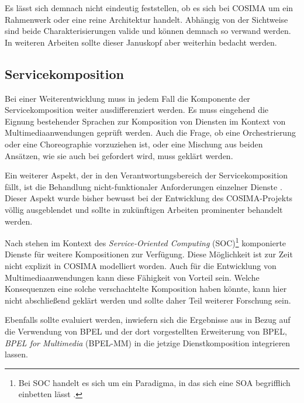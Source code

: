   Es lässt sich demnach nicht eindeutig feststellen, ob es sich bei COSIMA um ein Rahmenwerk oder eine reine Architektur handelt. Abhängig von der Sichtweise sind beide Charakterisierungen valide und können demnach so verwand werden. In weiteren Arbeiten sollte dieser Januskopf aber weiterhin bedacht werden.


\subsection{Servicekomposition} %
\label{sub:servicekomposition_fragen}

  Bei einer Weiterentwicklung muss in jedem Fall die Komponente der Servicekomposition weiter ausdifferenziert werden. Es muss eingehend die Eignung bestehender Sprachen zur Komposition von Diensten im Kontext von Multimediaanwendungen geprüft werden. Auch die Frage, ob eine Orchestrierung oder eine Choreographie vorzuziehen ist, oder eine Mischung aus beiden Ansätzen, wie sie auch bei \citep{papazoglou2007soc} gefordert wird, muss geklärt werden.
  
  Ein weiterer Aspekt, der in den Verantwortungsbereich der Servicekomposition fällt, ist die Behandlung nicht-funktionaler Anforderungen einzelner Dienste \citep[S. 42]{papazoglou2007soc}. Dieser Aspekt wurde bisher bewusst bei der Entwicklung des COSIMA-Projekts völlig ausgeblendet und sollte in zukünftigen Arbeiten prominenter behandelt werden.

  Nach \citep[S. 8]{service_oriented_computing} stehen im Kontext des \emph{Service-Oriented Computing} (SOC)\footnote{Bei SOC handelt es sich um ein Paradigma, in das sich eine SOA begrifflich einbetten lässt \citep[S. 8]{soa_goes_real}.} komponierte Dienste für weitere Kompositionen zur Verfügung. Diese Möglichkeit ist zur Zeit nicht explizit in COSIMA modelliert worden. Auch für die Entwicklung von Multimediaanwendungen kann diese Fähigkeit von Vorteil sein. Welche Konsequenzen eine solche verschachtelte Komposition haben könnte, kann hier nicht abschließend geklärt werden und sollte daher Teil weiterer Forschung sein.
  
  Ebenfalls sollte evaluiert werden, inwiefern sich die Ergebnisse aus \citep{samma08} in Bezug auf die Verwendung von BPEL und der dort vorgestellten Erweiterung von BPEL, \emph{BPEL for Multimedia} (BPEL-MM) in die jetzige Dienstkomposition integrieren lassen.


